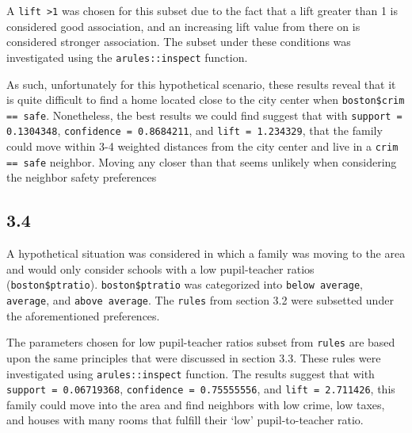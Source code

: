 \documentclass[]{article}
\newenvironment{Shaded}{\begin{snugshade}}{\end{snugshade}}
\newcommand{\KeywordTok}[1]{\textcolor[rgb]{0.13,0.29,0.53}{\textbf{{#1}}}}
\newcommand{\DataTypeTok}[1]{\textcolor[rgb]{0.13,0.29,0.53}{{#1}}}
\newcommand{\DecValTok}[1]{\textcolor[rgb]{0.00,0.00,0.81}{{#1}}}
\newcommand{\StringTok}[1]{\textcolor[rgb]{0.31,0.60,0.02}{{#1}}}
\newcommand{\NormalTok}[1]{{#1}}
\begin{document}
A \texttt{lift \textgreater{}1} was chosen for this subset due to the
fact that a lift greater than 1 is considered good association, and an
increasing lift value from there on is considered stronger association.
The subset under these conditions was investigated using the
\texttt{arules::inspect} function.

As such, unfortunately for this hypothetical scenario, these results
reveal that it is quite difficult to find a home located close to the
city center when
\texttt{boston\$crim == \textquotesingle{}safe\textquotesingle{}}.
Nonetheless, the best results we could find suggest that with
\texttt{support = 0.1304348}, \texttt{confidence = 0.8684211}, and
\texttt{lift = 1.234329}, that the family could move within 3-4 weighted
distances from the city center and live in a \texttt{crim == safe}
neighbor. Moving any closer than that seems unlikely when considering
the neighbor safety preferences

\subsection{3.4}\label{section-6}

A hypothetical situation was considered in which a family was moving to
the area and would only consider schools with a low pupil-teacher ratios
(\texttt{boston\$ptratio}). \texttt{boston\$ptratio} was categorized
into \texttt{below average}, \texttt{average}, and
\texttt{above average}. The \texttt{rules} from section 3.2 were
subsetted under the aforementioned preferences.

\begin{Shaded}
\end{Shaded}

The parameters chosen for low pupil-teacher ratios subset from
\texttt{rules} are based upon the same principles that were discussed in
section 3.3. These rules were investigated using
\texttt{arules::inspect} function. The results suggest that with
\texttt{support = 0.06719368}, \texttt{confidence = 0.75555556}, and
\texttt{lift = 2.711426}, this family could move into the area and find
neighbors with low crime, low taxes, and houses with many rooms that
fulfill their `low' pupil-to-teacher ratio.
\end{document}

